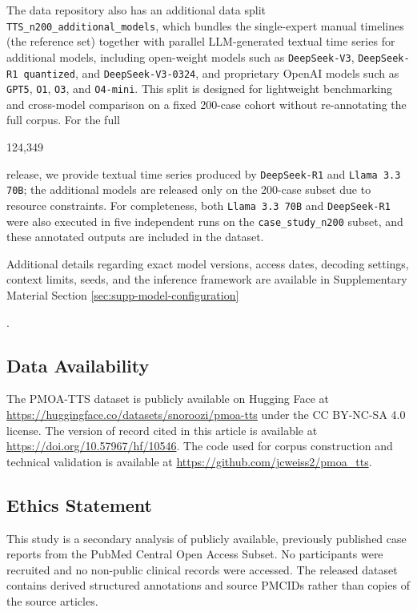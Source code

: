 \documentclass[pdflatex,sn-mathphys-num]{sn-jnl}%
\newif\ifshowrebuttalcolor
\newcommand{\rebuttal}[1]{%
  \ifshowrebuttalcolor
    \textcolor{rebuttalblue}{#1}%
  \else
    #1%
  \fi
}
\theoremstyle{thmstyleone}%
\theoremstyle{thmstyletwo}%
\theoremstyle{thmstylethree}%
\begin{document}
The data repository also has an additional data split \texttt{TTS\_n200\_additional\_models}, which bundles the single-expert manual timelines (the reference set) together with parallel LLM-generated textual time series for additional models, including open-weight models such as \texttt{DeepSeek-V3}, \texttt{DeepSeek-R1 quantized}, and \texttt{DeepSeek-V3-0324}, and proprietary OpenAI models such as \texttt{GPT5}, \texttt{O1}, \texttt{O3}, and \texttt{O4-mini}. This split is designed for lightweight benchmarking and cross-model comparison on a fixed 200-case cohort without re-annotating the full corpus. For the full \rebuttal{124{,}349} release, we provide textual time series produced by \texttt{DeepSeek-R1} and \texttt{Llama 3.3 70B}; the additional models are released only on the 200-case subset due to resource constraints. For completeness, both \texttt{Llama 3.3 70B} and \texttt{DeepSeek-R1} were also executed in five independent runs on the \texttt{case\_study\_n200} subset, and these annotated outputs are included in the dataset.
\rebuttal{Additional details regarding exact model versions, access dates, decoding settings, context limits, seeds, and the inference framework are available in Supplementary Material Section  \ref{sec:supp-model-configuration}}.

\subsection*{Data Availability}
\rebuttal{
The PMOA-TTS dataset is publicly available on Hugging Face at \url{https://huggingface.co/datasets/snoroozi/pmoa-tts} under the CC BY-NC-SA 4.0 license. The version of record cited in this article is available at \url{https://doi.org/10.57967/hf/10546}. The code used for corpus construction and technical validation is available at \url{https://github.com/jcweiss2/pmoa_tts}.
}


\subsection*{Ethics Statement}
\rebuttal{
This study is a secondary analysis of publicly available, previously published case reports from the PubMed Central Open Access Subset. No participants were recruited and no non-public clinical records were accessed. The released dataset contains derived structured annotations and source PMCIDs rather than copies of the source articles.
}

\end{document}
